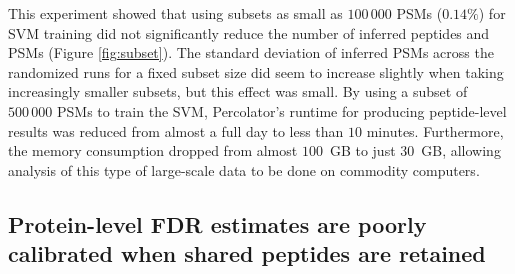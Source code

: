 \documentclass{article}
\begin{document}
This experiment showed that using subsets as small as $100\,000$ PSMs 
($0.14\%$) for SVM training did not significantly reduce the number of 
inferred peptides and PSMs (Figure \ref{fig:subset}). The standard 
deviation of inferred PSMs across the randomized runs for a fixed 
subset size did seem to increase slightly when taking increasingly 
smaller subsets, but this effect was small. By using a subset of 
$500\,000$ PSMs to train the SVM, Percolator's runtime for producing 
peptide-level results was reduced from almost a full day to less than 
$10$ minutes. Furthermore, the memory consumption dropped from almost 
$100$~GB to just $30$~GB, allowing analysis of this type of 
large-scale data to be done on commodity computers.

\subsection*{Protein-level FDR estimates are poorly calibrated when
  shared peptides are retained}
\end{document}
